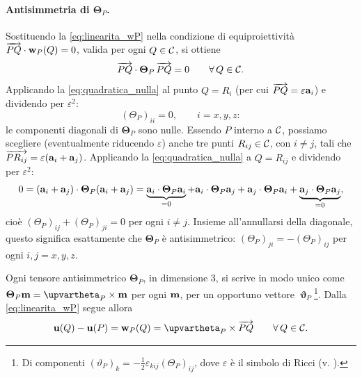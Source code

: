 \paragraph{Antisimmetria di $\bm{\Theta}_P$.}
Sostituendo la \eqref{eq:linearita_wP} nella condizione di equiproiettività $\overrightarrow{PQ}\cdot\mathbf{w}_P(Q)=0$, valida per ogni $Q\in\mathcal{C}$, si ottiene
\begin{equation}\label{eq:quadratica_nulla}
	\overrightarrow{PQ}\cdot \bm{\Theta}_P\,\overrightarrow{PQ} = 0 \qquad \forall\, Q\in\mathcal{C}.
\end{equation}
Applicando la \eqref{eq:quadratica_nulla} al punto $Q=R_i$ (per cui $\overrightarrow{PQ}=\varepsilon\mathbf{a}_i$) e dividendo per $\varepsilon^2$:
\begin{equation}
	(\Theta_P)_{ii} = 0, \qquad i=x,y,z:
\end{equation}
le componenti diagonali di $\bm{\Theta}_P$ sono nulle. Essendo $P$ interno a $\mathcal{C}$, possiamo scegliere (eventualmente riducendo $\varepsilon$) anche tre punti $R_{ij}\in\mathcal{C}$, con $i\neq j$, tali che $\overrightarrow{PR_{ij}}=\varepsilon(\mathbf{a}_i+\mathbf{a}_j)$. Applicando la \eqref{eq:quadratica_nulla} a $Q=R_{ij}$ e dividendo per $\varepsilon^2$:
\begin{equation}
	0=(\mathbf{a}_i+\mathbf{a}_j)\cdot \bm{\Theta}_P(\mathbf{a}_i+\mathbf{a}_j)
	= \underbrace{\mathbf{a}_i\cdot \bm{\Theta}_P\mathbf{a}_i}_{=0} + \mathbf{a}_i\cdot \bm{\Theta}_P\mathbf{a}_j+\mathbf{a}_j\cdot \bm{\Theta}_P\mathbf{a}_i+\underbrace{\mathbf{a}_j\cdot \bm{\Theta}_P\mathbf{a}_j}_{=0},
\end{equation}
cioè $(\Theta_P)_{ij}+(\Theta_P)_{ji}=0$ per ogni $i\neq j$. Insieme all'annullarsi della diagonale, questo significa esattamente che $\bm{\Theta}_P$ è antisimmetrico: $(\Theta_P)_{ji}=-(\Theta_P)_{ij}$ per ogni $i,j=x,y,z$.


Ogni tensore antisimmetrico $\bm{\Theta}_P$, in dimensione 3, si scrive in modo unico come $\bm{\Theta}_P\mb=\bm{\upvartheta}_P\times\mb$ per ogni $\mathbf{m}$, per un opportuno vettore $\bm{\upvartheta}_P$\footnote{Di componenti $(\vartheta_P)_k=-\tfrac12\varepsilon_{kij}(\Theta_P)_{ij}$, dove $\varepsilon$ è il simbolo di Ricci (v.  ).}. Dalla \eqref{eq:linearita_wP} segue allora
\begin{equation}\label{eq:formula_polo_P}
	\ub(Q)-\ub(P) = \wb_P(Q) = \bm{\upvartheta}_P\times\overrightarrow{PQ} \qquad \forall\, Q\in\Cc.
\end{equation}

